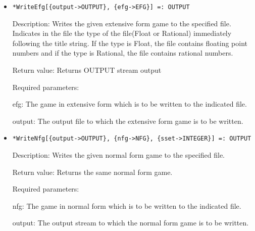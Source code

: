 \begin{itemize}
\item

\protect \large \begin{verbatim}
*WriteEfg[{output->OUTPUT}, {efg->EFG}] =: OUTPUT
\end{verbatim}\normalsize

\bd
\item
[Description:] Writes the given extensive form game to the
specified file.  Indicates in the file the type of the file(Float or
Rational) immediately following the title string.  If the type is
Float, the file contains floating point numbers and if the type is
Rational, the file contains rational numbers.
\item
[Return value:] Returns OUTPUT stream output
\item
[Required parameters:]\hfil\null

\bd
\item
[efg:] The game in extensive form which is to be written to the
indicated file.
\item
[output:] The output file to which the extensive form game is to
be written.
\ed
\ed

\item

\protect \large \begin{verbatim}
*WriteNfg[{output->OUTPUT}, {nfg->NFG}, {sset->INTEGER}] =: OUTPUT
\end{verbatim}\normalsize

\bd
\item
[Description:] Writes the given normal form game to the specified
file.
\item
[Return value:] Returns the same normal form game.
\item
[Required parameters:]\hfil\null

\bd
\item
[nfg:] The game in normal form which is to be written to the
indicated file.

\item
[output:] The output stream to which the normal form game is to be
written.
\ed
\ed




\end{itemize}










 




















